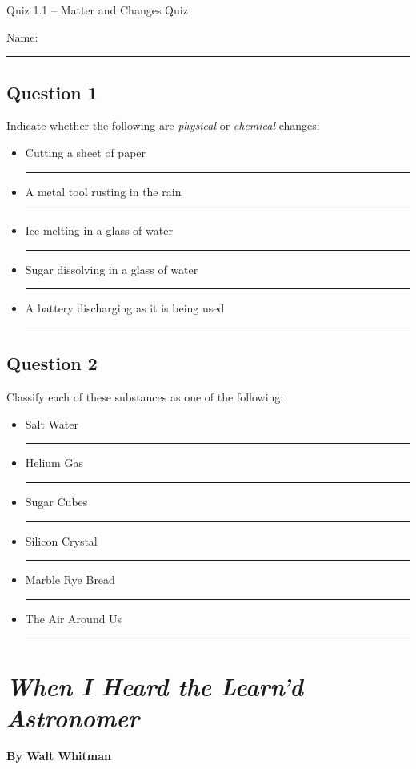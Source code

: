 \documentclass[11pt, letterpaper]{memoir}
\begin{document}
\begin{center}
	{\large	Quiz 1.1 -- Matter and Changes Quiz}
\end{center}
{\large Name: \rule[-1mm]{4in}{.1pt}
\subsection*{Question 1}
Indicate whether the following are \emph{physical} or \emph{chemical} changes:
\begin{itemize}
	\item Cutting a sheet of paper \rule[-2pt]{8em}{1pt}
	\item A metal tool rusting in the rain \rule[-2pt]{8em}{1pt}
	\item Ice melting in a glass of water \rule[-2pt]{8em}{1pt}
	\item Sugar dissolving in a glass of water \rule[-2pt]{8em}{1pt}
	\item A battery discharging as it is being used \rule[-2pt]{8em}{1pt}
\end{itemize}
\subsection*{Question 2}
Classify each of these substances as one of the following:


\begin{itemize}
	\item Salt Water \rule[-2pt]{12em}{1pt}
	\item Helium Gas \rule[-2pt]{12em}{1pt}
	\item Sugar Cubes \rule[-2pt]{12em}{1pt}
	\item Silicon Crystal \rule[-2pt]{12em}{1pt}
	\item Marble Rye Bread \rule[-2pt]{12em}{1pt}
	\item The Air Around Us \rule[-2pt]{12em}{1pt}
\end{itemize}

\newpage
\pagestyle{empty}
\addtocounter{page}{-1}
\section*{\emph{When I Heard the Learn'd Astronomer}}
\paragraph{By Walt Whitman}~

}
\end{document}
